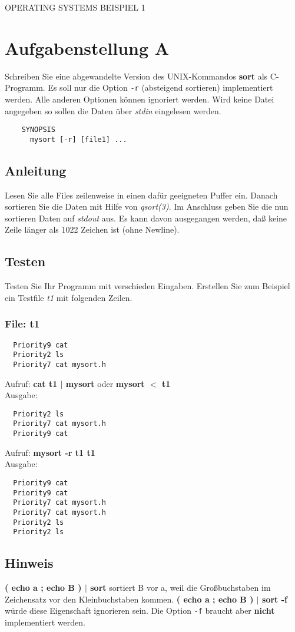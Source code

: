 \documentclass{article}
\begin{document}
\begin{center}
\begin{Large}
OPERATING SYSTEMS BEISPIEL 1
\end{Large}
\end{center}

\section*{Aufgabenstellung A}
Schreiben Sie eine abgewandelte Version des UNIX-Kommandos {\bf sort} als C-Programm. Es soll nur die Option \verb|-r| (absteigend sortieren) implementiert werden. Alle anderen Optionen können ignoriert werden. Wird keine Datei angegeben so sollen die Daten \"uber \emph{stdin} eingelesen werden.

\begin{verbatim}
	SYNOPSIS
	  mysort [-r] [file1] ...
\end{verbatim}

\subsection*{Anleitung}
Lesen Sie alle Files zeilenweise in einen dafür geeigneten Puffer ein.
Danach sortieren Sie die Daten mit Hilfe von \emph{qsort(3)}. Im Anschluss geben Sie die nun sortieren Daten auf \emph{stdout} aus. Es kann davon ausgegangen werden, daß keine Zeile länger als 1022 Zeichen ist (ohne Newline).

\subsection*{Testen}
Testen Sie Ihr Programm mit verschieden Eingaben. Erstellen Sie zum Beispiel ein Testfile \emph{t1} mit folgenden Zeilen.

\subsubsection*{File: t1}
\begin{verbatim}
  Priority9 cat
  Priority2 ls
  Priority7 cat mysort.h
\end{verbatim}
Aufruf: {\bf cat t1 $|$ mysort} oder {\bf mysort $<$ t1} \\
Ausgabe: 
\begin{verbatim}
  Priority2 ls
  Priority7 cat mysort.h
  Priority9 cat
\end{verbatim}


Aufruf: {\bf mysort -r t1 t1} \\
Ausgabe: 
\begin{verbatim}
  Priority9 cat
  Priority9 cat
  Priority7 cat mysort.h
  Priority7 cat mysort.h
  Priority2 ls
  Priority2 ls
\end{verbatim}

\subsection*{Hinweis}
{\bf { ( echo a ; echo B )} $|$ sort} sortiert B vor a, weil die Großbuchstaben im Zeichensatz vor den Kleinbuchstaben kommen. {\bf { ( echo a ; echo B )} $|$ sort -f} würde diese Eigenschaft ignorieren sein. Die Option \verb|-f| braucht aber {\bf nicht} implementiert werden.
\end{document}
